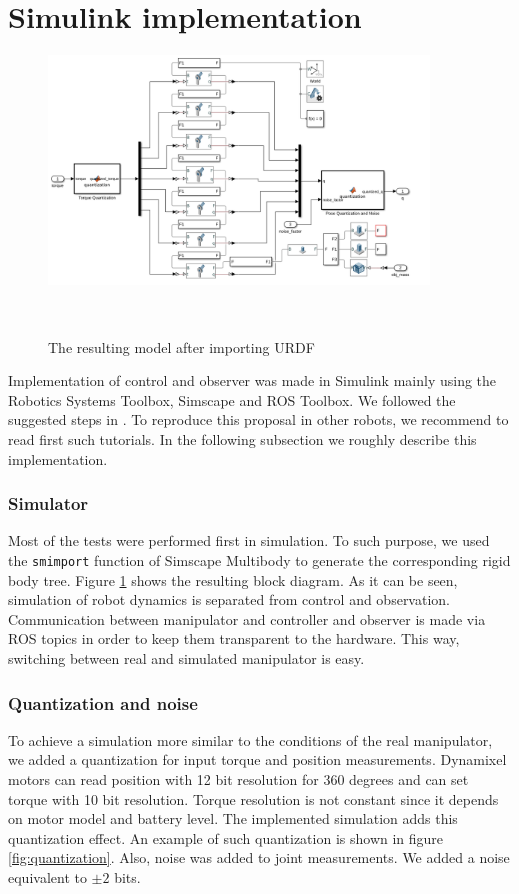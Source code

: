 \documentclass[a4paper, 10pt]{article}
\begin{document}
\section{Simulink implementation}
\label{sec:implementation}
\begin{figure}[h!]
  \centering
  \includegraphics[width=0.9\textwidth]{Figures/ManipulatorModel.png}
  \caption{The resulting model after importing URDF}\
  \label{fig:SimulinkModel}
\end{figure}

Implementation of control and observer was made in Simulink mainly using the Robotics Systems Toolbox, Simscape and ROS Toolbox. We followed the suggested steps in \cite{matlab_designing, matlab_trajectory}. To reproduce this proposal in other robots, we recommend to read first such tutorials. In the following subsection we roughly describe this implementation.

\subsubsection*{Simulator}
Most of the tests were performed first in simulation. To such purpose, we used the \texttt{smimport} function of Simscape Multibody to generate the corresponding rigid body tree. Figure \ref{fig:SimulinkModel} shows the resulting block diagram. As it can be seen, simulation of robot dynamics is separated from control and observation. Communication between manipulator and controller and observer is made via ROS topics in order to keep them transparent to the hardware. This way, switching between real and simulated manipulator is easy.

\subsubsection*{Quantization and noise}
To achieve a simulation more similar to the conditions of the real manipulator, we added a quantization for input torque and position measurements. Dynamixel motors can read position with 12 bit resolution for 360 degrees and can set torque with 10 bit resolution. Torque resolution is not constant since it depends on motor model and battery level. The implemented simulation adds this quantization effect. An example of such quantization is shown in figure \ref{fig:quantization}. Also, noise was added to joint measurements. We added a noise equivalent to $\pm 2$ bits. 
\end{document}
